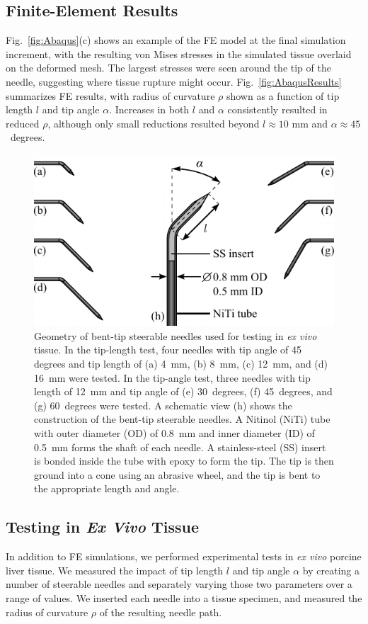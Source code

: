 \subsection{Finite-Element Results}
Fig.~\ref{fig:Abaqus}(c) shows an example of the FE model at the final simulation increment, with the resulting von Mises stresses in the simulated tissue overlaid on the deformed mesh. The largest stresses were seen around the tip of the needle, suggesting where tissue rupture might occur. Fig.~\ref{fig:AbaqusResults} summarizes FE results, with radius of curvature $\rho$ shown as a function of tip length $l$ and tip angle $\alpha$. Increases in both $l$ and $\alpha$ consistently resulted in reduced $\rho$, although only small reductions resulted beyond $l \approx 10$ mm and $\alpha \approx 45$~degrees.  

\begin{figure}[!t]
\centering
\includegraphics[width=0.75\columnwidth]{Images/Chapter3/Bent-TipGeometry/Bent-TipGeometry}%
\caption[Geometry of bent-tip steerable needles used for testing]{Geometry of bent-tip steerable needles used for testing in \textit{ex vivo} tissue. In the tip-length test, four needles with tip angle of 45 degrees and tip length of (a) 4~mm, (b) 8~mm, (c) 12~mm, and (d) 16~mm were tested. In the tip-angle test, three needles with tip length of 12~mm and tip angle of (e) 30~degrees, (f) 45~degrees, and (g) 60~degrees were tested. A schematic view (h) shows the construction of the bent-tip steerable needles. A Nitinol (NiTi) tube with outer diameter (OD) of 0.8~mm and inner diameter (ID) of 0.5~mm forms the shaft of each needle. A stainless-steel (SS) insert is bonded inside the tube with epoxy to form the tip. The tip is then ground into a cone using an abrasive wheel, and the tip is bent to the appropriate length and angle.}
\label{fig:Bent-TipGeometry}
\end{figure}

\subsection{Testing in \textit{Ex Vivo} Tissue}
In addition to FE simulations, we performed experimental tests in \textit{ex vivo} porcine liver tissue. We measured the impact of tip length $l$ and tip angle $\alpha$ by creating a number of steerable needles and separately varying those two parameters over a range of values. We inserted each needle into a tissue specimen, and measured the radius of curvature $\rho$ of the resulting needle path.

